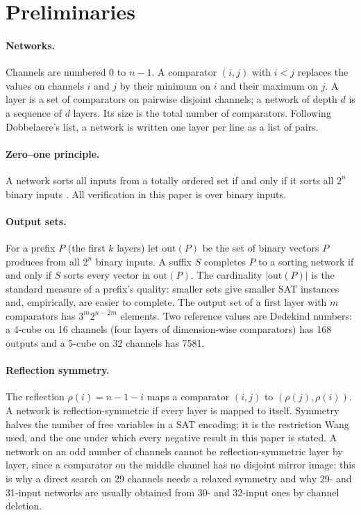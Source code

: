 \documentclass[11pt,a4paper]{article}
\theoremstyle{plain}
\theoremstyle{definition}
\theoremstyle{remark}
\newcommand{\out}{\mathrm{out}}
\newcommand{\dob}{Dobbelaere's list}
\begin{document}
\section{Preliminaries}\label{sec:prelim}

\paragraph{Networks.} Channels are numbered $0$ to $n-1$. A comparator $(i,j)$ with $i<j$ replaces the values on channels $i$ and $j$ by their minimum on $i$ and their maximum on $j$. A layer is a set of comparators on pairwise disjoint channels; a network of depth $d$ is a sequence of $d$ layers. Its size is the total number of comparators. Following \dob, a network is written one layer per line as a list of pairs.

\paragraph{Zero--one principle.} A network sorts all inputs from a totally ordered set if and only if it sorts all $2^n$ binary inputs \cite[\S5.3.4]{Knuth}. All verification in this paper is over binary inputs.

\paragraph{Output sets.} For a prefix $P$ (the first $k$ layers) let $\out(P)$ be the set of binary vectors $P$ produces from all $2^n$ binary inputs. A suffix $S$ completes $P$ to a sorting network if and only if $S$ sorts every vector in $\out(P)$. The cardinality $|\out(P)|$ is the standard measure of a prefix's quality: smaller sets give smaller SAT instances and, empirically, are easier to complete. The output set of a first layer with $m$ comparators has $3^m 2^{n-2m}$ elements. Two reference values are Dedekind numbers: a 4-cube on 16 channels (four layers of dimension-wise comparators) has 168 outputs and a 5-cube on 32 channels has 7581.

\paragraph{Reflection symmetry.} The reflection $\rho(i)=n-1-i$ maps a comparator $(i,j)$ to $(\rho(j),\rho(i))$. A network is reflection-symmetric if every layer is mapped to itself. Symmetry halves the number of free variables in a SAT encoding; it is the restriction Wang used, and the one under which every negative result in this paper is stated. A network on an odd number of channels cannot be reflection-symmetric layer by layer, since a comparator on the middle channel has no disjoint mirror image; this is why a direct search on 29 channels needs a relaxed symmetry and why 29- and 31-input networks are usually obtained from 30- and 32-input ones by channel deletion.
\end{document}
